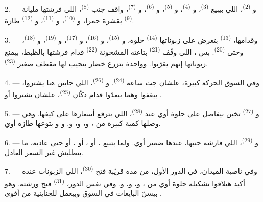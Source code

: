 2. --- و \textsuperscript{(2)}، اللي بيبيع
 \textsuperscript{(3)}، و \textsuperscript{(4)}،
و \textsuperscript{(5)}، و \textsuperscript{(6)}،
و \textsuperscript{(7)}، واقف جنب 
\textsuperscript{(8)}، اللي فرشتها مليانة  \textsuperscript{(9)}
بقشرة حمرا، و \textsuperscript{(10)}، و \textsuperscript{(11)}، و \textsuperscript{(12)} طازة.

3. --- وقدامها،  \textsuperscript{(13)} بتعرض على زبوناتها
 \textsuperscript{(14)} حلوة، و \textsuperscript{(15)}،
و \textsuperscript{(16)}، و \textsuperscript{(17)}،
و \textsuperscript{(19)}، و \textsuperscript{(18)}، وحتى
 \textsuperscript{(20)}. بس ، اللي وقّف
 \textsuperscript{(21)} بتاعته المشحونة 
\textsuperscript{(22)} قدام فرشتها بالظبط، بيمنع زبوناتها إنهم يقرّبوا. وواحدة
بتزرع خضار بتجيب لها مقطف صغير  \textsuperscript{(23)}.

\VUsaut{4.0mm}
\VUsaut{3.0mm}

4. --- وفي السوق الحركة كبيرة، علشان جت ساعة  \textsuperscript{(24)}.
و \textsuperscript{(26)}، اللي جايين هنا يشتروا، بيقفوا وهما
بيعدّوا قدام دكّان  \textsuperscript{(25)}، علشان يشتروا
 أو .

5. --- و \textsuperscript{(27)} تخين بيفاصل على  حلوة أوي
عند  \textsuperscript{(28)}، اللي بترفع أسعارها على كيفها. وهي
وصلها كمية كبيرة من ، و، و،
و. و و بتوعها طازة أوي.

\VUsaut{4.0mm}
\VUsaut{3.0mm}

6. --- و \textsuperscript{(29)}، اللي فارشة جنبها، عندها ضمير
أوي. ولما بتبيع ، أو ، أو ، أو حتى
 عادية، ما بتطلبش غير السعر العادل.

7. --- وفي ناصية الميدان، في الدور الأول، من مدة قريّبة فتح 
\textsuperscript{(30)}، اللي الزبونات عنده أكيد هيلاقوا تشكيلة حلوة أوي من
، و، و، و. وفي نفس
الدور،  \textsuperscript{(31)} فتح ورشته. وهو بيسنّ 
البايعات في السوق وبيعمل للجناينية  من أقوى .

